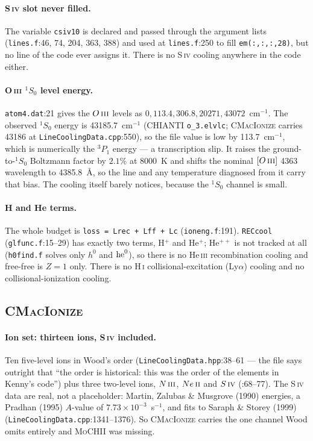 \documentclass[english,a4paper]{my_memo}
\newcommand{\code}[1]{\texttt{#1}}
\newcommand{\MoCHII}{\textsc{MoCHII}}
\newcommand{\CMI}{\textsc{CMacIonize}}
\newcommand{\HI}{H\,\textsc{i}}
\newcommand{\HeIII}{He\,\textsc{iii}}
\newcommand{\OIII}{O\,\textsc{iii}}
\newcommand{\NIII}{N\,\textsc{iii}}
\newcommand{\SIV}{S\,\textsc{iv}}
\newcommand{\NeII}{Ne\,\textsc{ii}}
\begin{document}
\paragraph{\SIV{} slot never filled.}  The variable \code{csiv10} is declared
and passed through the argument lists (\code{lines.f}:46, 74, 204, 363, 388)
and used at \code{lines.f}:250 to fill \code{em(:,:,:,28)}, but no line of the
code ever assigns it.  There is no \SIV{} cooling anywhere in the code either.

\paragraph{\OIII{} $^1S_0$ level energy.}  \code{atom4.dat}:21 gives the
$\OIII{}$ levels as $0, 113.4, 306.8, 20271, 43072$~cm$^{-1}$.  The observed
$^1S_0$ energy is 43185.7~cm$^{-1}$ (CHIANTI \code{o\_3.elvlc}; \CMI{} carries
43186 at \code{LineCoolingData.cpp}:550), so the file value is low by
113.7~cm$^{-1}$, which is numerically the $^3P_1$ energy --- a transcription
slip.  It raises the ground-to-$^1S_0$ Boltzmann factor by $2.1\%$ at 8000~K
and shifts the nominal $[\OIII{}]$ 4363 wavelength to 4385.8~\AA{}, so the
line and any temperature diagnosed from it carry that bias.  The cooling itself
barely notices, because the $^1S_0$ channel is small.

\paragraph{H and He terms.}  The whole budget is
\code{loss = Lrec + Lff + Lc} (\code{ioneng.f}:191).  \code{RECcool}
(\code{glfunc.f}:15--29) has exactly two terms, H$^+$ and He$^+$; He$^{++}$ is
not tracked at all (\code{h0find.f} solves only $h^0$ and ${\rm he}^0$), so
there is no \HeIII{} recombination cooling and free-free is $Z = 1$ only.
There is no \HI{} collisional-excitation (Ly$\alpha$) cooling and no
collisional-ionization cooling.

\subsection{\CMI{}}

\paragraph{Ion set: thirteen ions, \SIV{} included.}  Ten five-level ions in
Wood's order (\code{LineCoolingData.hpp}:38--61 --- the file says outright that
``the order is historical: this was the order of the elements in Kenny's
code'') plus three two-level ions, $\NIII{}$, $\NeII{}$ and $\SIV{}$
(:68--77).  The \SIV{} data are real, not a placeholder: Martin, Zalubas \&
Musgrove (1990) energies, a Pradhan (1995) $A$-value of
$7.73\times10^{-3}$~s$^{-1}$, and fits to Saraph \& Storey (1999)
(\code{LineCoolingData.cpp}:1341--1376).  So \CMI{} carries the one channel
Wood omits entirely and \MoCHII{} was missing.
\end{document}
